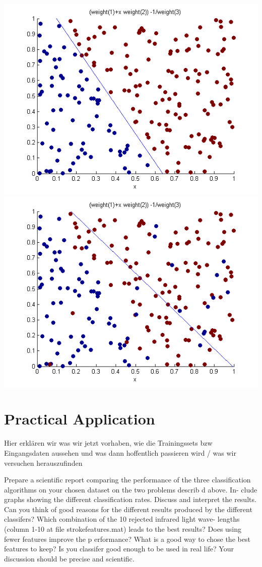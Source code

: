 \documentclass{article}
\begin{document}
\includegraphics[scale=0.5]{img/200_of_200_correct}
\includegraphics[scale=0.5]{img/142_of_200_correct}

\section{Practical Application}

Hier erklären wir was wir jetzt vorhaben, wie die Trainingssets bzw Eingangsdaten aussehen und was dann hoffentlich passieren wird / was wir versuchen herauszufinden

Prepare a scientific report comparing the performance of the three classification
algorithms on your chosen dataset on the two problems describ d above. In-
clude graphs showing the different classification rates. Discuss and interpret the
results. Can you think of good reasons for the different results produced by the
different classifers? Which combination of the 10 rejected infrared light wave-
lengths (column 1-10 at file strokefeatures.mat) leads to the best results?
Does using fewer features improve the p erformance? What is a good way to
chose the best features to keep? Is you classifer good enough to be used in real
life? Your discussion should be precise and scientific. 
\end{document}
